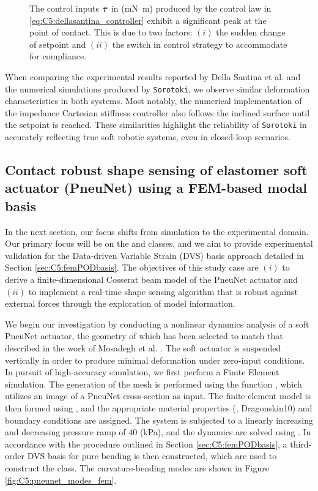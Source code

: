 {\begin{figure}[!t]
    \caption{\small The control inputs $\boldsymbol{\tau}$ in (\si{\milli \newton \meter}) produced by the control law in \eqref{eq:C5:dellasantina_controller} exhibit a significant peak at the point of contact. This is due to two factors: $(i)$ the sudden change of setpoint and $(ii)$ the switch in control strategy to accommodate for compliance.}
    \label{fig:C5:dellasantina_input}
\end{figure}
\clearpage
}

When comparing the experimental results reported by Della Santina et al. \cite{DellaSantina2020Jan} and the numerical simulations produced by \texttt{Sorotoki}, we observe similar deformation characteristics in both systems. Most notably, the numerical implementation of the impedance Cartesian stiffness controller also follows the inclined surface until the setpoint is reached. These similarities highlight the reliability of \texttt{Sorotoki} in accurately reflecting true soft robotic systems, even in closed-loop scenarios. 

\subsection[Contact robust shape sensing of elastomer soft actuator]{Contact robust shape sensing of elastomer soft actuator (PneuNet) using a FEM-based modal basis}
In the next section, our focus shifts from simulation to the experimental domain. Our primary focus will be on the  and  classes, and we aim to provide experimental validation for the Data-driven Variable Strain (DVS) basis approach detailed in Section \ref{sec:C5:femPODbasis}. The objectives of this study case are $(i)$ to derive a finite-dimensional Cosserat beam model of the PneuNet actuator and $(ii)$ to implement a real-time shape sensing algorithm that is robust against external forces through the exploration of model information.

We begin our investigation by conducting a nonlinear dynamics analysis of a soft PneuNet actuator, the geometry of which has been selected to match that described in the work of Mosadegh et al. \cite{Mosadegh2014}. The soft actuator is suspended vertically in order to produce minimal deformation under zero-input conditions. In pursuit of high-accuracy simulation, we first perform a Finite Element simulation. The generation of the mesh is performed using the function , which utilizes an image of a PneuNet cross-section as input. The finite element model is then formed using , and the appropriate material properties (\ie, Dragonskin10) and boundary conditions are assigned. The system is subjected to a linearly increasing and decreasing pressure ramp of $40$ (\si{\kilo \pascal}), and the dynamics are solved using . In accordance with the procedure outlined in Section \ref{sec:C5:femPODbasis}, a third-order DVS basis for pure bending is then constructed, which are used to construct the  class. The curvature-bending modes are shown in Figure \ref{fig:C5:pneunet_modes_fem}. 
%

